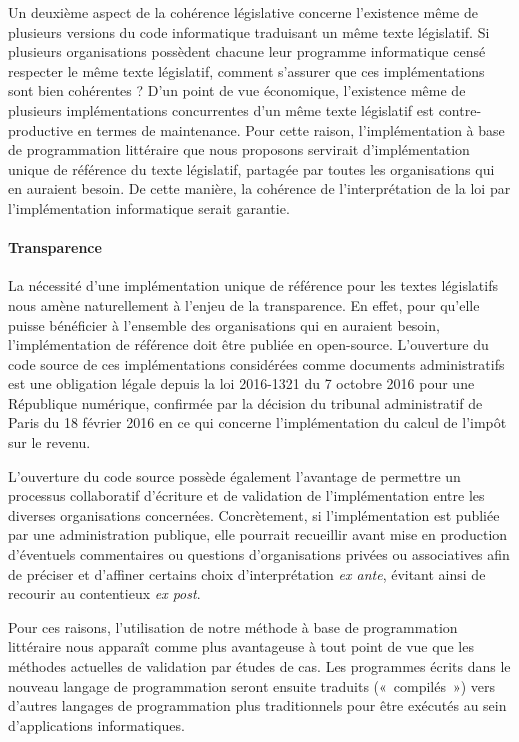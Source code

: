 Un deuxième aspect de la cohérence législative concerne l'existence même de plusieurs versions du code informatique traduisant un même texte législatif. Si plusieurs organisations possèdent chacune leur programme informatique censé respecter le même texte législatif, comment s'assurer que ces implémentations sont bien cohérentes ? D'un point de vue économique, l'existence même de plusieurs implémentations concurrentes d'un même texte législatif est contre-productive en termes de maintenance. Pour cette raison, l’implémentation à base de programmation littéraire que nous proposons servirait d’implémentation unique de référence du texte législatif, partagée par toutes les organisations qui en auraient besoin. De cette manière, la cohérence de l’interprétation de la loi par l’implémentation informatique serait garantie.

\paragraph{Transparence} La nécessité d'une implémentation unique de référence pour les textes législatifs nous amène naturellement à l'enjeu de la transparence. En effet, pour qu'elle puisse bénéficier à l'ensemble des organisations qui en auraient besoin, l'implémentation de référence doit être publiée en open-source. L'ouverture du code source de ces implémentations considérées comme documents administratifs est une obligation légale depuis la loi 2016-1321 du 7 octobre 2016 pour une République numérique, confirmée par la décision du tribunal administratif de Paris du 18 février 2016 en ce qui concerne l'implémentation du calcul de l'impôt sur le revenu.

L'ouverture du code source possède également l'avantage de permettre un processus collaboratif d'écriture et de validation de l'implémentation entre les diverses organisations concernées. Concrètement, si l'implémentation est publiée par une administration publique, elle pourrait recueillir avant mise en production d'éventuels commentaires ou questions d'organisations privées ou associatives afin de préciser et d'affiner certains choix d'interprétation \emph{ex ante}, évitant ainsi de recourir au contentieux \emph{ex post}.

Pour ces raisons, l'utilisation de notre méthode à base de programmation littéraire nous apparaît comme plus avantageuse à tout point de vue que les méthodes actuelles de validation par études de cas. Les programmes écrits dans le nouveau langage de programmation seront ensuite traduits (« compilés ») vers d'autres langages de programmation plus traditionnels pour être exécutés au sein d'applications informatiques.
